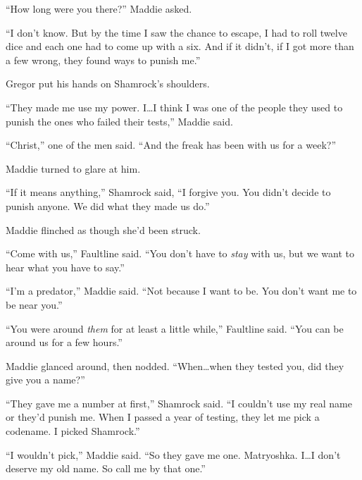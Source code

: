 ``How long were you there?'' Maddie asked.



``I don't know.  But by the time I saw the chance to escape, I had to roll twelve dice and each one had to come up with a six.  And if it didn't, if I got more than a few wrong, they found ways to punish me.''



Gregor put his hands on Shamrock's shoulders.



``They made me use my power.  I\ldots I think I was one of the people they used to punish the ones who failed their tests,'' Maddie said.



``Christ,'' one of the men said.  ``And the freak has been with us for a week?''



Maddie turned to glare at him.



``If it means anything,'' Shamrock said, ``I forgive you.  You didn't decide to punish anyone.  We did what they made us do.''



Maddie flinched as though she'd been struck.



``Come with us,'' Faultline said.  ``You don't have to \emph{stay} with us, but we want to hear what you have to say.''



``I'm a predator,'' Maddie said.  ``Not because I want to be.  You don't want me to be near you.''



``You were around \emph{them} for at least a little while,'' Faultline said.  ``You can be around us for a few hours.''



Maddie glanced around, then nodded.  ``When\ldots when they tested you, did they give you a name?''



``They gave me a number at first,'' Shamrock said.  ``I couldn't use my real name or they'd punish me.  When I passed a year of testing, they let me pick a codename.  I picked Shamrock.''



``I wouldn't pick,'' Maddie said.  ``So they gave me one.  Matryoshka.  I\ldots I don't deserve my old name.  So call me by that one.''



